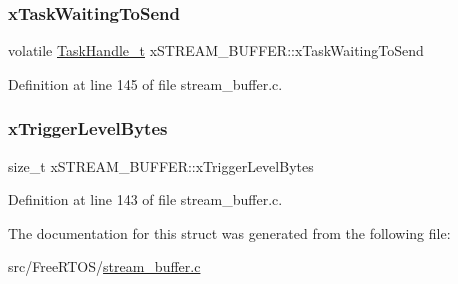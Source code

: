 \subsubsection{\texorpdfstring{x\+Task\+Waiting\+To\+Send}{xTaskWaitingToSend}}
{\footnotesize\ttfamily volatile \hyperlink{task_8h_ae95f44d4cfeb4a599c6cc258d241cb6b}{Task\+Handle\+\_\+t} x\+S\+T\+R\+E\+A\+M\+\_\+\+B\+U\+F\+F\+E\+R\+::x\+Task\+Waiting\+To\+Send}



Definition at line 145 of file stream\+\_\+buffer.\+c.

\mbox{\label{structx_s_t_r_e_a_m___b_u_f_f_e_r_ac2d391ae2521c8c94b4e0d12802dc34b}} 
\subsubsection{\texorpdfstring{x\+Trigger\+Level\+Bytes}{xTriggerLevelBytes}}
{\footnotesize\ttfamily size\+\_\+t x\+S\+T\+R\+E\+A\+M\+\_\+\+B\+U\+F\+F\+E\+R\+::x\+Trigger\+Level\+Bytes}



Definition at line 143 of file stream\+\_\+buffer.\+c.



The documentation for this struct was generated from the following file\+:\begin{DoxyCompactItemize}
\item 
src/\+Free\+R\+T\+O\+S/\hyperlink{stream__buffer_8c}{stream\+\_\+buffer.\+c}\end{DoxyCompactItemize}
